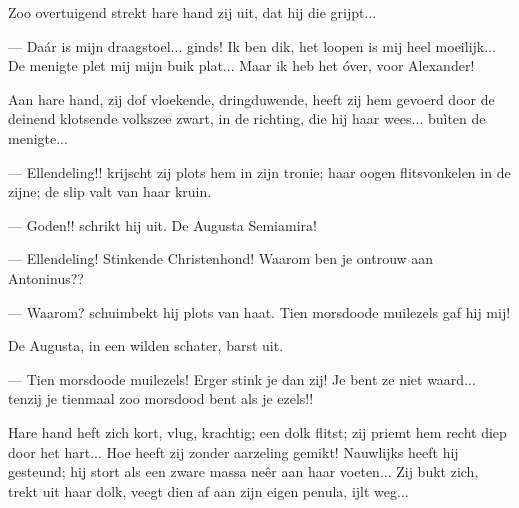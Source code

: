 \documentclass[a4paper, 12pt, oneside, dutch]{article}
\begin{document}
Zoo overtuigend strekt hare hand zij uit, dat hij die grijpt...

--- Daár is mijn draagstoel... ginds! Ik ben dik, het loopen is mij heel moeilijk... De menigte plet mij mijn buik plat... Maar ik heb het óver, voor Alexander!

Aan hare hand, zij dof vloekende, dringduwende, heeft zij hem gevoerd door de deinend klotsende volkszee zwart, in de richting, die hij haar wees... buìten de menigte...

--- Ellendeling!! krijscht zij plots hem in zijn tronie; haar oogen flitsvonkelen in de zijne; de slip valt van haar kruin.

--- Goden!! schrikt hij uit. De Augusta Semiamira!

--- Ellendeling! Stinkende Christenhond! Waarom ben je ontrouw aan Antoninus??

--- Waarom? schuimbekt hij plots van haat. Tien morsdoode muilezels gaf hij mij!

De Augusta, in een wilden schater, barst uit.

--- Tien morsdoode muilezels! Erger stink je dan zij! Je bent ze niet waard... tenzij je tienmaal zoo morsdood bent als je ezels!!

Hare hand heft zich kort, vlug, krachtig; een dolk flitst; zij priemt hem recht diep door het hart... Hoe heeft zij zonder aarzeling gemikt! Nauwlijks heeft hij gesteund; hij stort als een zware massa neêr aan haar voeten... Zij bukt zich, trekt uit haar dolk, veegt dien af aan zijn eigen penula, ijlt weg...
\end{document}
